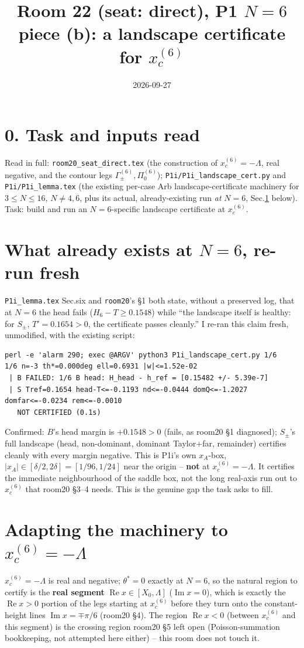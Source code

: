 \documentclass[11pt]{article}
\title{Room 22 (seat: direct), P1 $N=6$ piece (b): a landscape certificate for $x_c^{(6)}$}
\date{2026-09-27}
\begin{document}
\maketitle

\section*{0. Task and inputs read}
Read in full: \texttt{room20\_seat\_direct.tex} (the construction of $x_c^{(6)}=-\Lambda$, real negative,
and the contour legs $\Gamma_\pm^{(6)},\Pi_0^{(6)}$); \texttt{P1i/P1i\_landscape\_cert.py} and
\texttt{P1i/P1i\_lemma.tex} (the existing per-case Arb landscape-certificate machinery for
$3\le N\le16$, $N\ne4,6$, plus its actual, already-existing run \emph{at} $N=6$, Sec.\ref{sec:existing}
below). Task: build and run an $N=6$-specific landscape certificate at $x_c^{(6)}$.

\section{What already exists at $N=6$, re-run fresh}\label{sec:existing}
\texttt{P1i\_lemma.tex} Sec.six and \texttt{room20}'s \S1 both state, without a preserved log, that at
$N=6$ the head fails ($H_6-T\ge0.1548$) while ``the landscape itself is healthy: for $S_\pm$, $T'=0.1654>0$,
the certificate passes cleanly.'' I re-ran this claim fresh, unmodified, with the existing script:
\begin{verbatim}
perl -e 'alarm 290; exec @ARGV' python3 P1i_landscape_cert.py 1/6
1/6 n=-3 th*=0.000deg ell=0.6931 |w|<=1.52e-02
 | B FAILED: 1/6 B head: H_head - h_ref = [0.15482 +/- 5.39e-7]
 | S Tref=0.1654 head-T<=-0.1193 nd<=-0.0444 domQ<=-1.2027 domfar<=-0.0234 rem<=-0.0010
   NOT CERTIFIED (0.1s)
\end{verbatim}
Confirmed: $B$'s head margin is $+0.1548>0$ (fails, as room20 \S1 diagnosed); $S_\pm$'s full landscape
(head, non-dominant, dominant Taylor+far, remainder) certifies cleanly with every margin negative. This
is P1i's own $x_A$-box, $|x_A|\in[\delta/2,2\delta]=[1/96,1/24]$ near the origin -- \textbf{not} at
$x_c^{(6)}=-\Lambda$. It certifies the immediate neighbourhood of the saddle box, not the long real-axis
run out to $x_c^{(6)}$ that room20 \S3--4 needs. This is the genuine gap the task asks to fill.

\section{Adapting the machinery to $x_c^{(6)}=-\Lambda$}
$x_c^{(6)}=-\Lambda$ is real and negative; $\theta^*=0$ exactly at $N=6$, so the natural region to certify
is the \textbf{real segment} $\operatorname{Re}x\in[X_0,\Lambda]$ ($\operatorname{Im}x=0$), which is
exactly the $\operatorname{Re}x>0$ portion of the legs starting at $x_c^{(6)}$ before they turn onto the
constant-height lines $\operatorname{Im}x=\mp\pi/6$ (room20 \S4). The region $\operatorname{Re}x<0$
(between $x_c^{(6)}$ and this segment) is the crossing region room20 \S5 left open (Poisson-summation
bookkeeping, not attempted here either) -- this room does not touch it.
\end{document}
